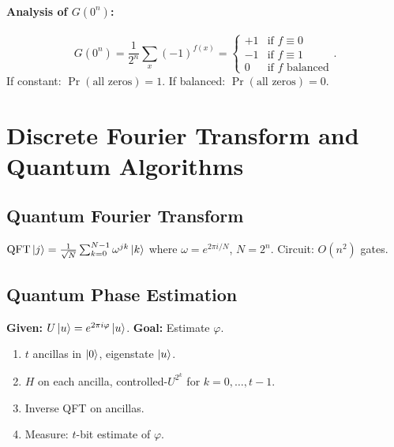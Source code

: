 \documentclass[10pt,a4paper]{article}
\begin{document}
\paragraph{Analysis of $G(0^n)$:}
\[
G(0^n)=\frac{1}{2^n}\sum_x(-1)^{f(x)}=\begin{cases}+1 & \text{if }f\equiv 0\\ -1 & \text{if }f\equiv 1\\ 0 & \text{if }f\text{ balanced}\end{cases}.
\]
If constant: $\Pr(\text{all zeros})=1$. If balanced: $\Pr(\text{all zeros})=0$.

\newpage
\section{Discrete Fourier Transform and Quantum Algorithms}

\subsection{Quantum Fourier Transform}

\begin{tcolorbox}[defstyle, title={Definition}]
$\mathrm{QFT}\ket{j}=\frac{1}{\sqrt{N}}\sum_{k=0}^{N-1}\omega^{jk}\ket{k}$ where $\omega=e^{2\pi i/N}$, $N=2^n$. Circuit: $O(n^2)$ gates.
\end{tcolorbox}

\subsection{Quantum Phase Estimation}

\begin{tcolorbox}[algostyle, title={Algorithm}]
\textbf{Given:} $U\ket{u}=e^{2\pi i\varphi}\ket{u}$. \textbf{Goal:} Estimate $\varphi$.
\begin{enumerate}[nosep]
\item $t$ ancillas in $\ket{0}$, eigenstate $\ket{u}$.
\item $H$ on each ancilla, controlled-$U^{2^k}$ for $k=0,\dots,t-1$.
\item Inverse QFT on ancillas.
\item Measure: $t$-bit estimate of $\varphi$.
\end{enumerate}
\end{tcolorbox}
\end{document}
